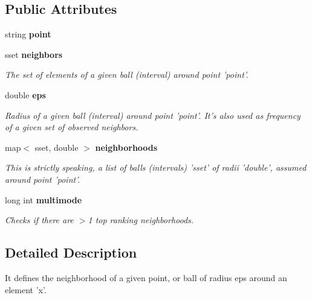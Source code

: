 \subsection*{Public Attributes}
\begin{CompactItemize}
\item 
string {\bf point}\label{classsNeighborhood_o0}

\item 
sset {\bf neighbors}\label{classsNeighborhood_o1}

\begin{CompactList}\small\item\em The set of elements of a given ball (interval) around point 'point'. \item\end{CompactList}\item 
double {\bf eps}\label{classsNeighborhood_o2}

\begin{CompactList}\small\item\em Radius of a given ball (interval) around point 'point'. It's also used as frequency of a given set of observed neighbors. \item\end{CompactList}\item 
map$<$ sset, double $>$ {\bf neighborhoods}\label{classsNeighborhood_o3}

\begin{CompactList}\small\item\em This is strictly speaking, a list of balls (intervals) 'sset' of radii 'double', assumed around point 'point'. \item\end{CompactList}\item 
long int {\bf multimode}\label{classsNeighborhood_o4}

\begin{CompactList}\small\item\em Checks if there are $>$1 top ranking neighborhoods. \item\end{CompactList}\end{CompactItemize}


\subsection{Detailed Description}
It defines the neighborhood of a given point, or ball of radius eps around an element 'x'. 

